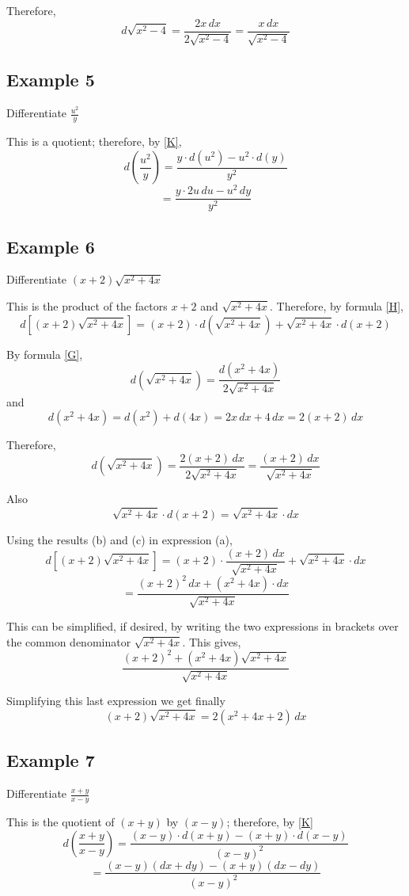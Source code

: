 Therefore,
\[d\sqrt{x^2 - 4} = \frac{2x\,dx}{2\sqrt{x^2-4}} = \frac{x\,dx}{\sqrt{x^2-4}}\]

\subsection*{Example 5}
Differentiate $\frac{u^2}{y}$

This is a quotient; therefore, by \eqref{K},
\[d(\frac{u^2}{y}) = \frac{y\cdot d(u^2) - u^2\cdot d(y)}{y^2}\]
\[= \frac{y\cdot 2u\,du - u^2\,dy}{y^2}\]

\subsection*{Example 6}
Differentiate $(x+2)\sqrt{x^2+4x}$

This is the product of the factors $x+2$ and $\sqrt{x^2+4x}$. Therefore, by formula \eqref{H},
\[d[(x+2)\sqrt{x^2+4x}] = (x+2)\cdot d(\sqrt{x^2+4x}) + \sqrt{x^2+4x}\cdot d(x+2) \tag{a} \label{a}\]

By formula \eqref{G},
\[d(\sqrt{x^2+4x}) = \frac{d(x^2+4x)}{2\sqrt{x^2+4x}}\]
and
\[d(x^2+4x) = d(x^2) + d(4x) = 2x\,dx + 4\,dx = 2(x+2)\,dx\]

Therefore,
\[d(\sqrt{x^2+4x}) = \frac{2(x+2)\,dx}{2\sqrt{x^2+4x}} = \frac{(x+2)\,dx}{\sqrt{x^2+4x}} \tag{b} \label{b}\]

Also
\[\sqrt{x^2+4x}\cdot d(x+2) = \sqrt{x^2+4x}\cdot dx \tag{c} \label{c}\]

Using the results (b) and (c) in expression (a),
\[d[(x+2)\sqrt{x^2+4x}] = (x+2)\cdot\frac{(x+2)\,dx}{\sqrt{x^2+4x}} + \sqrt{x^2+4x}\cdot dx\]
\[= \frac{(x+2)^2\,dx + (x^2+4x)\cdot dx}{\sqrt{x^2+4x}}\]

This can be simplified, if desired, by writing the two expressions in brackets over the common denominator $\sqrt{x^2+4x}$. This gives,
\[\frac{(x+2)^2 + (x^2+4x)\sqrt{x^2+4x}}{\sqrt{x^2+4x}}\]

Simplifying this last expression we get finally
\[(x+2)\sqrt{x^2+4x} = 2(x^2+4x+2)\,dx\]

\subsection*{Example 7}
Differentiate $\frac{x+y}{x-y}$

This is the quotient of $(x+y)$ by $(x-y)$; therefore, by \eqref{K}
\[d(\frac{x+y}{x-y}) = \frac{(x-y)\cdot d(x+y) - (x+y)\cdot d(x-y)}{(x-y)^2}\]
\[= \frac{(x-y)(dx+dy)-(x+y)(dx-dy)}{(x-y)^2}\]

